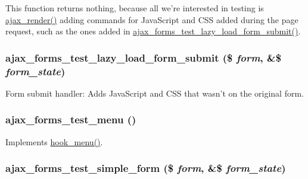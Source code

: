 This function returns nothing, because all we're interested in testing is \hyperlink{group__ajax_ga241c2426bdde049c55b05b7bf5d714a2}{ajax\_\-render()} adding commands for JavaScript and CSS added during the page request, such as the ones added in \hyperlink{ajax__forms__test_8module_a58fcf2df136929f4d0a22a7616ef8824}{ajax\_\-forms\_\-test\_\-lazy\_\-load\_\-form\_\-submit()}. \hypertarget{ajax__forms__test_8module_a58fcf2df136929f4d0a22a7616ef8824}{
\subsubsection[{ajax\_\-forms\_\-test\_\-lazy\_\-load\_\-form\_\-submit}]{\setlength{\rightskip}{0pt plus 5cm}ajax\_\-forms\_\-test\_\-lazy\_\-load\_\-form\_\-submit (\$ {\em form}, \/  \&\$ {\em form\_\-state})}}
\label{ajax__forms__test_8module_a58fcf2df136929f4d0a22a7616ef8824}
Form submit handler: Adds JavaScript and CSS that wasn't on the original form. \hypertarget{ajax__forms__test_8module_ad49111b8b86fa5af3b7e9a0d0570d17a}{
\subsubsection[{ajax\_\-forms\_\-test\_\-menu}]{\setlength{\rightskip}{0pt plus 5cm}ajax\_\-forms\_\-test\_\-menu ()}}
\label{ajax__forms__test_8module_ad49111b8b86fa5af3b7e9a0d0570d17a}
Implements \hyperlink{group__hooks_ga5c95244fea59b25666e409759e133ded}{hook\_\-menu()}. \hypertarget{ajax__forms__test_8module_a012279e867d0f7f4665d6d561f6f7b79}{
\subsubsection[{ajax\_\-forms\_\-test\_\-simple\_\-form}]{\setlength{\rightskip}{0pt plus 5cm}ajax\_\-forms\_\-test\_\-simple\_\-form (\$ {\em form}, \/  \&\$ {\em form\_\-state})}}
